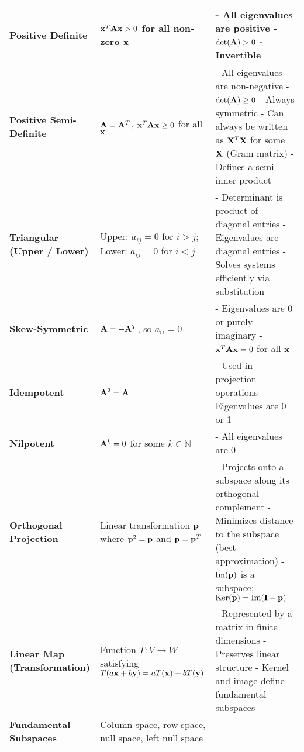 \documentclass[12pt]{article}
\begin{document}
\begin{longtable}{|>{\bfseries}m{3.5cm}|m{5cm}|m{10.5cm}|}
		\hline
		Positive Definite & $\mathbf{x}^T \mathbf{A} \mathbf{x} > 0$ for all non-zero $\mathbf{x}$ &
		- All eigenvalues are positive \newline
		- $\det(\mathbf{A}) > 0$ \newline
		- Invertible \\
		\hline
		Positive Semi-Definite & $\mathbf{A} = \mathbf{A}^T$, $\mathbf{x}^T \mathbf{A} \mathbf{x} \ge 0$ for all $\mathbf{x}$ &
		- All eigenvalues are non-negative \newline
		- $\det(\mathbf{A}) \ge 0$ \newline
		- Always symmetric \newline
		- Can always be written as $\mathbf{X}^T \mathbf{X}$ for some $\mathbf{X}$ (Gram matrix) \newline
		- Defines a semi-inner product \\
		\hline
		Triangular (Upper / Lower) &
		Upper: $a_{ij} = 0$ for $i > j$; Lower: $a_{ij} = 0$ for $i < j$ &
		- Determinant is product of diagonal entries \newline
		- Eigenvalues are diagonal entries \newline
		- Solves systems efficiently via substitution \\
		\hline
		Skew-Symmetric & $\mathbf{A} = -\mathbf{A}^T$, so $a_{ii} = 0$ &
		- Eigenvalues are 0 or purely imaginary \newline
		- $\mathbf{x}^T \mathbf{A} \mathbf{x} = 0$ for all $\mathbf{x}$ \\
		\hline
		Idempotent & $\mathbf{A}^2 = \mathbf{A}$ &
		- Used in projection operations \newline
		- Eigenvalues are 0 or 1 \\
		\hline
		Nilpotent & $\mathbf{A}^k = 0$ for some $k \in \mathbb{N}$ &
		- All eigenvalues are 0 \\
		\hline
		Orthogonal Projection & Linear transformation $\mathbf{p}$ where $\mathbf{p}^2 = \mathbf{p}$
		and $\mathbf{p} = \mathbf{p}^T$ &
		- Projects onto a subspace along its orthogonal complement \newline
		- Minimizes distance to the subspace (best approximation) \newline
		- $\text{Im}(\mathbf{p})$ is a subspace; $\text{Ker}(\mathbf{p}) = \text{Im}(\mathbf{I} - \mathbf{p})$ \\
		\hline
		Linear Map (Transformation) & Function $T: V \rightarrow W$
		satisfying $T(a\mathbf{x} + b\mathbf{y}) = aT(\mathbf{x}) + bT(\mathbf{y})$ &
		- Represented by a matrix in finite dimensions \newline
		- Preserves linear structure \newline
		- Kernel and image define fundamental subspaces \\
		\hline
		Fundamental Subspaces & Column space, row space, null space, left null space &

\end{longtable}
\end{document}
